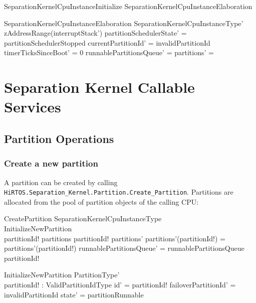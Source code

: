 \documentclass[11pt,letterpaper,twoside,openany]{book}
\begin{document}
\begin{schema}{SeparationKernelCpuInstanceInitialize}
   SeparationKernelCpuInstanceElaboration
\end{schema}

\begin{schema}{SeparationKernelCpuInstanceElaboration}
   SeparationKernelCpuInstanceType'
\where
   zAddressRange(interruptStack') \neq \emptyset
\also
    partitionSchedulerState' = partitionSchedulerStopped
\also
   currentPartitionId' = invalidPartitionId
\also
   timerTicksSinceBoot' = 0
\also
   runnablePartitionsQueue' = \langle \rangle
\also
   partitions' = \emptyset
\end{schema}

\section{Separation Kernel Callable Services}

\subsection{Partition Operations}

\subsubsection{Create a new partition}

A partition can be created by calling \verb`HiRTOS.Separation_Kernel.Partition.Create_Partition`.
Partitions are allocated from the pool of partition objects of the calling CPU:

\begin{schema}{CreatePartition}
   \Delta SeparationKernelCpuInstanceType \\
   InitializeNewPartition \\
\where
   partitionId! \notin \dom partitions
\also
   partitionId! \in \dom partitions'
\also
   partitions'(partitionId!) = partitions'(partitionId!)
\also
   runnablePartitionsQueue' = runnablePartitionsQueue \cat \langle partitionId! \rangle
\end{schema}

\begin{schema}{InitializeNewPartition}
   PartitionType' \\
   partitionId! : ValidPartitionIdType
\where
   id' = partitionId!
\also
   failoverPartitionId' = invalidPartitionId
\also
   state' = partitionRunnable
\end{schema}
\end{document}
